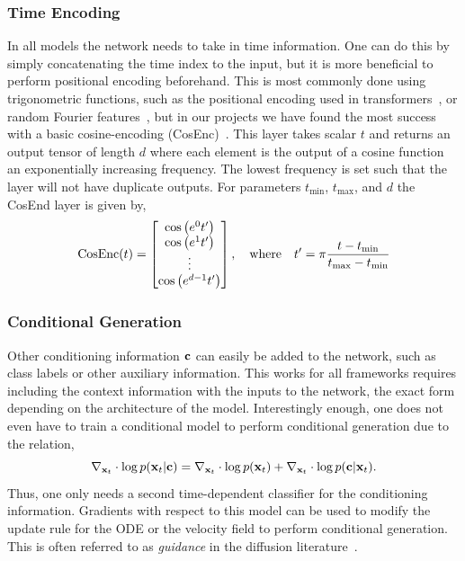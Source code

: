 \subsubsection{Time Encoding}

In all models the network needs to take in time information.
One can do this by simply concatenating the time index to the input, but it is more beneficial to perform positional encoding beforehand.
This is most commonly done using trigonometric functions, such as the positional encoding used in transformers~\cite{Attention}, or random Fourier features~\cite{FourierFeaturesLet}, but in our projects we have found the most success with a basic cosine-encoding (CosEnc)~\cite{ImplicitQuantileNetworks}.
This layer takes scalar $t$ and returns an output tensor of length $d$ where each element is the output of a cosine function an exponentially increasing frequency.
The lowest frequency is set such that the layer will not have duplicate outputs.
For parameters $t_\text{min}$, $t_\text{max}$, and $d$ the CosEnd layer is given by,
\begin{equation}
    \label{eq:cosine_encoding}
    \text{CosEnc}(t) =
    \begin{bmatrix}
        \cos\left(e^0 t'\right) \\
        \cos\left(e^1 t'\right) \\
        \vdots \\
        \cos\left(e^{d-1} t'\right)
    \end{bmatrix}, \quad \text{where} \quad t' = \pi \frac{t - t_\text{min}}{t_\text{max} - t_\text{min}} \\
\end{equation}

\subsubsection{Conditional Generation}

Other conditioning information $\mathbf{c}$ can easily be added to the network, such as class labels or other auxiliary information.
This works for all frameworks requires including the context information with the inputs to the network, the exact form depending on the architecture of the model.
Interestingly enough, one does not even have to train a conditional model to perform conditional generation due to the relation,
\begin{equation}
    \label{eq:conditional_generation}
    \nabla_{\mathbf{x}_t} \cdot \log p(\mathbf{x}_t | \mathbf{c}) = \nabla_{\mathbf{x}_t} \cdot \log p(\mathbf{x}_t) + \nabla_{\mathbf{x}_t} \cdot \log p(\mathbf{c} | \mathbf{x}_t).
\end{equation}
Thus, one only needs a second time-dependent classifier for the conditioning information.
Gradients with respect to this model can be used to modify the update rule for the ODE or the velocity field to perform conditional generation.
This is often referred to as \textit{guidance} in the diffusion literature~\cite{DiffusionBeatsGANS}.

